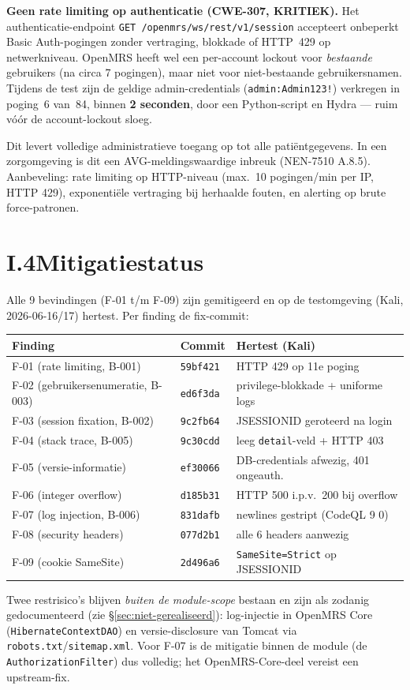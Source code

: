 \documentclass[12pt, a4paper]{report}
\begin{document}
\textbf{Geen rate limiting op authenticatie (CWE-307, KRITIEK).}
Het authenticatie-endpoint \texttt{GET /openmrs/ws/rest/v1/session} accepteert
onbeperkt Basic Auth-pogingen zonder vertraging, blokkade of HTTP~429 op
netwerkniveau. OpenMRS heeft wel een per-account lockout voor \emph{bestaande}
gebruikers (na circa 7 pogingen), maar niet voor niet-bestaande gebruikersnamen.
Tijdens de test zijn de geldige admin-credentials
(\texttt{admin:Admin123!}) verkregen in poging~6 van~84, binnen \textbf{2 seconden},
door een Python-script en Hydra --- ruim vóór de account-lockout sloeg.

Dit levert volledige administratieve toegang op tot alle patiëntgegevens. In een
zorgomgeving is dit een AVG-meldingswaardige inbreuk (NEN-7510 A.8.5). Aanbeveling:
rate limiting op HTTP-niveau (max.\ 10 pogingen/min per IP, HTTP 429), exponentiële
vertraging bij herhaalde fouten, en alerting op brute force-patronen.

\section*{I.4\quad Mitigatiestatus}

Alle 9 bevindingen (F-01 t/m F-09) zijn gemitigeerd en op de testomgeving
(Kali, 2026-06-16/17) hertest. Per finding de fix-commit:

{\small
\begin{tabular}{@{}l l l@{}}
\toprule
\textbf{Finding} & \textbf{Commit} & \textbf{Hertest (Kali)} \\
\midrule
F-01 (rate limiting, B-001)      & \texttt{59bf421} & HTTP 429 op 11e poging \\
F-02 (gebruikersenumeratie, B-003) & \texttt{ed6f3da} & privilege-blokkade + uniforme logs \\
F-03 (session fixation, B-002)   & \texttt{9c2fb64} & JSESSIONID geroteerd na login \\
F-04 (stack trace, B-005)        & \texttt{9c30cdd} & leeg \texttt{detail}-veld + HTTP 403 \\
F-05 (versie-informatie)         & \texttt{ef30066} & DB-credentials afwezig, 401 ongeauth. \\
F-06 (integer overflow)          & \texttt{d185b31} & HTTP 500 i.p.v.\ 200 bij overflow \\
F-07 (log injection, B-006)      & \texttt{831dafb} & newlines gestript (CodeQL 9 \textrightarrow{} 0) \\
F-08 (security headers)          & \texttt{077d2b1} & alle 6 headers aanwezig \\
F-09 (cookie SameSite)           & \texttt{2d496a6} & \texttt{SameSite=Strict} op JSESSIONID \\
\bottomrule
\end{tabular}
}

\vspace{0.4em}
\noindent Twee restrisico's blijven \emph{buiten de module-scope} bestaan en zijn
als zodanig gedocumenteerd (zie \S\ref{sec:niet-gerealiseerd}): log-injectie in
OpenMRS Core (\texttt{HibernateContextDAO}) en versie-disclosure van Tomcat via
\texttt{robots.txt}/\texttt{sitemap.xml}. Voor F-07 is de mitigatie binnen de
module (de \texttt{AuthorizationFilter}) dus volledig; het OpenMRS-Core-deel
vereist een upstream-fix.
\end{document}
